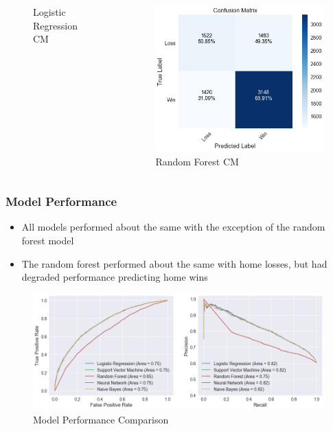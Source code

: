 \documentclass{beamer}
\begin{document}
\begin{frame}
\begin{columns}
\begin{figure}
\caption{Logistic Regression CM}
\end{figure}
\vspace{-1cm}
\begin{figure}
\includegraphics[scale=0.23]{../docs/assets/images/model-performance/random-forest-confusion-matrix.png}
\caption{Random Forest CM}
\end{figure}
\end{columns}
\end{frame}

\begin{frame}
\frametitle{Model Performance}
\begin{itemize}
    \item All models performed about the same with the exception of the random forest model
    \item The random forest performed about the same with home losses, but had degraded performance predicting home wins
\end{itemize}
\begin{figure}
\includegraphics[scale=0.35]{../docs/assets/images/model-performance/model-performance-comparison.png}
\caption{Model Performance Comparison}
\end{figure}
\end{frame}
\end{document}
